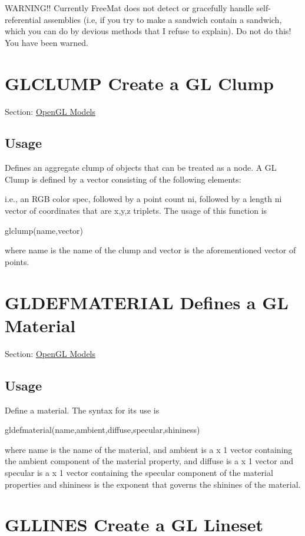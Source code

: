 W\-A\-R\-N\-I\-N\-G!! Currently Free\-Mat does not detect or gracefully handle self-\/referential assemblies (i.\-e, if you try to make a {\ttfamily sandwich} contain a {\ttfamily sandwich}, which you can do by devious methods that I refuse to explain). Do not do this! You have been warned. \hypertarget{glwin_glclump}{}\section{G\-L\-C\-L\-U\-M\-P Create a G\-L Clump}\label{glwin_glclump}
Section\-: \hyperlink{sec_glwin}{Open\-G\-L Models} \hypertarget{vtkwidgets_vtkxyplotwidget_Usage}{}\subsection{Usage}\label{vtkwidgets_vtkxyplotwidget_Usage}
Defines an aggregate clump of objects that can be treated as a node. A G\-L Clump is defined by a vector consisting of the following elements\-: \begin{DoxyVerb}   [r1 g1 b1 n1 p1 p2 p3 ... r2 g2 b2 n2 p1 p2 p3 ... ]
\end{DoxyVerb}
 i.\-e., an R\-G\-B color spec, followed by a point count {\ttfamily ni}, followed by a length {\ttfamily ni} vector of coordinates that are {\ttfamily x,y,z} triplets. The usage of this function is \begin{DoxyVerb}   glclump(name,vector)
\end{DoxyVerb}
 where {\ttfamily name} is the name of the clump and {\ttfamily vector} is the aforementioned vector of points. \hypertarget{glwin_gldefmaterial}{}\section{G\-L\-D\-E\-F\-M\-A\-T\-E\-R\-I\-A\-L Defines a G\-L Material}\label{glwin_gldefmaterial}
Section\-: \hyperlink{sec_glwin}{Open\-G\-L Models} \hypertarget{vtkwidgets_vtkxyplotwidget_Usage}{}\subsection{Usage}\label{vtkwidgets_vtkxyplotwidget_Usage}
Define a material. The syntax for its use is \begin{DoxyVerb}  gldefmaterial(name,ambient,diffuse,specular,shininess)
\end{DoxyVerb}
 where {\ttfamily name} is the name of the material, and {\ttfamily ambient} is a { x 1} vector containing the ambient component of the material property, and {\ttfamily diffuse} is a { x 1} vector and {\ttfamily specular} is a { x 1} vector containing the specular component of the material properties and {\ttfamily shininess} is the exponent that governs the shinines of the material. \hypertarget{glwin_gllines}{}\section{G\-L\-L\-I\-N\-E\-S Create a G\-L Lineset}\label{glwin_gllines}
